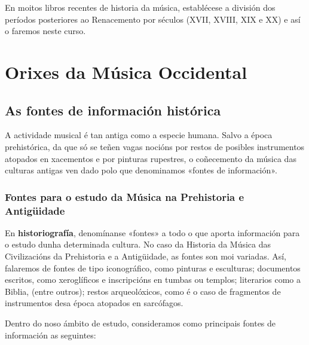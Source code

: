 \documentclass[a4paper, twoside]{templates/ociamthesis}
\begin{document}
En moitos libros recentes de historia da música, establécese a división dos períodos posteriores ao Renacemento por séculos (XVII, XVIII, XIX e XX) e así o faremos neste curso.

\hypertarget{orixes-da-muxfasica-occidental}{%
\chapter{Orixes da Música Occidental}\label{orixes-da-muxfasica-occidental}}

\minitoc 

\hypertarget{as-fontes-de-informaciuxf3n-histuxf3rica}{%
\section{As fontes de información histórica}\label{as-fontes-de-informaciuxf3n-histuxf3rica}}

A actividade musical é tan antiga como a especie humana. Salvo a época prehistórica, da que só se teñen vagas nocións por restos de posibles instrumentos atopados en xacementos e por pinturas rupestres, o coñecemento da música das culturas antigas ven dado polo que denominamos «fontes de información».

\hypertarget{fontes-para-o-estudo-da-muxfasica-na-prehistoria-e-antiguxfcidade}{%
\subsection{Fontes para o estudo da Música na Prehistoria e Antigüidade}\label{fontes-para-o-estudo-da-muxfasica-na-prehistoria-e-antiguxfcidade}}

En \textbf{historiografía}, denomínanse «fontes» a todo o que aporta información para o estudo dunha determinada cultura. No caso da Historia da Música das Civilizacións da Prehistoria e a Antigüidade, as fontes son moi variadas. Así, falaremos de fontes de tipo iconográfico, como pinturas e esculturas; documentos escritos, como xeroglíficos e inscripcións en tumbas ou templos; literarios como a Biblia, (entre outros); restos arqueolóxicos, como é o caso de fragmentos de instrumentos desa época atopados en sarcófagos.

Dentro do noso ámbito de estudo, consideramos como principais fontes de información as seguintes:
\end{document}
